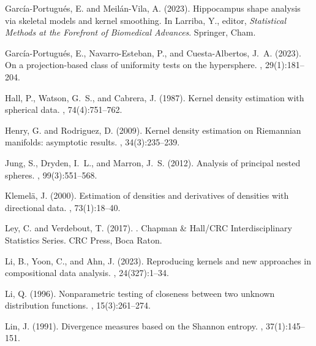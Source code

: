 \documentclass[oneside,11pt]{article}
\begin{document}
\begin{thebibliography}{}
	Garc\'ia-Portugu\'es, E. and Meil\'an-Vila, A. (2023).
	\newblock Hippocampus shape analysis via skeletal models and kernel smoothing.
	\newblock In Larriba, Y., editor, {\em Statistical Methods at the Forefront of
		Biomedical Advances}. Springer, Cham.

	Garc\'ia-Portugu\'es, E., Navarro-Esteban, P., and Cuesta-Albertos, J.~A.
	(2023).
	\newblock On a projection-based class of uniformity tests on the hypersphere.
	, 29(1):181--204.

	Hall, P., Watson, G.~S., and Cabrera, J. (1987).
	\newblock Kernel density estimation with spherical data.
	, 74(4):751--762.

	Henry, G. and Rodriguez, D. (2009).
	\newblock Kernel density estimation on {R}iemannian manifolds: asymptotic
	results.
	, 34(3):235--239.

	Jung, S., Dryden, I.~L., and Marron, J.~S. (2012).
	\newblock Analysis of principal nested spheres.
	, 99(3):551--568.

	Klemel\"a, J. (2000).
	\newblock Estimation of densities and derivatives of densities with directional
	data.
	, 73(1):18--40.

	Ley, C. and Verdebout, T. (2017).
	.
	\newblock Chapman \& Hall/CRC Interdisciplinary Statistics Series. CRC Press,
	Boca Raton.

	Li, B., Yoon, C., and Ahn, J. (2023).
	\newblock Reproducing kernels and new approaches in compositional data
	analysis.
	, 24(327):1--34.

	Li, Q. (1996).
	\newblock Nonparametric testing of closeness between two unknown distribution
	functions.
	, 15(3):261--274.

	Lin, J. (1991).
	\newblock Divergence measures based on the {S}hannon entropy.
	, 37(1):145--151.


\end{thebibliography}
\end{document}

